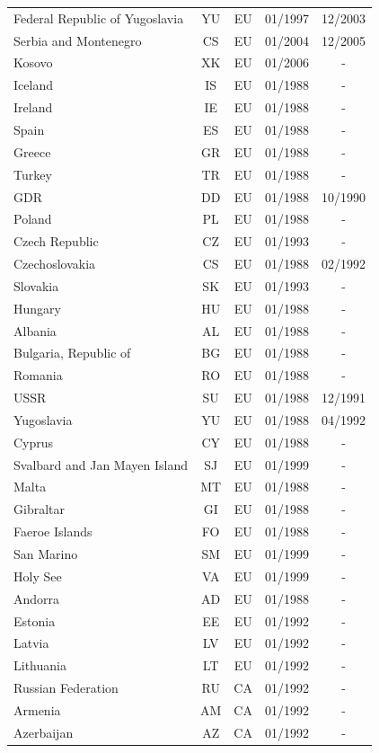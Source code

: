 \begin{small}
\begin{longtable}{p{7.5cm}cccc}
Federal Republic of Yugoslavia	&	YU	&	EU	&	01/1997	&	12/2003	\\
Serbia and Montenegro	&	CS	&	EU	&	01/2004	&	12/2005	\\
Kosovo	&	XK	&	EU	&	01/2006	&	-	\\
Iceland	&	IS	&	EU	&	01/1988	&	-	\\
Ireland	&	IE	&	EU	&	01/1988	&	-	\\
Spain	&	ES	&	EU	&	01/1988	&	-	\\
Greece	&	GR	&	EU	&	01/1988	&	-	\\
Turkey	&	TR	&	EU	&	01/1988	&	-	\\
GDR	&	DD	&	EU	&	01/1988	&	10/1990	\\
Poland	&	PL	&	EU	&	01/1988	&	-	\\
Czech Republic	&	CZ	&	EU	&	01/1993	&	-	\\
Czechoslovakia	&	CS	&	EU	&	01/1988	&	02/1992	\\
Slovakia	&	SK	&	EU	&	01/1993	&	-	\\
Hungary	&	HU	&	EU	&	01/1988	&	-	\\
Albania	&	AL	&	EU	&	01/1988	&	-	\\
Bulgaria, Republic of	&	BG	&	EU	&	01/1988	&	-	\\
Romania	&	RO	&	EU	&	01/1988	&	-	\\
USSR	&	SU	&	EU	&	01/1988	&	12/1991	\\
Yugoslavia	&	YU	&	EU	&	01/1988	&	04/1992	\\
Cyprus	&	CY	&	EU	&	01/1988	&	-	\\
Svalbard and Jan Mayen Island	&	SJ	&	EU	&	01/1999	&	-	\\
Malta	&	MT	&	EU	&	01/1988	&	-	\\
Gibraltar	&	GI	&	EU	&	01/1988	&	-	\\
Faeroe Islands	&	FO	&	EU	&	01/1988	&	-	\\
San Marino	&	SM	&	EU	&	01/1999	&	-	\\
Holy See	&	VA	&	EU	&	01/1999	&	-	\\
Andorra	&	AD	&	EU	&	01/1988	&	-	\\
Estonia	&	EE	&	EU	&	01/1992	&	-	\\
Latvia	&	LV	&	EU	&	01/1992	&	-	\\
Lithuania	&	LT	&	EU	&	01/1992	&	-	\\
Russian Federation	&	RU	&	CA	&	01/1992	&	-	\\
Armenia	&	AM	&	CA	&	01/1992	&	-	\\
Azerbaijan	&	AZ	&	CA	&	01/1992	&	-	\\

\end{longtable}
\end{small}
